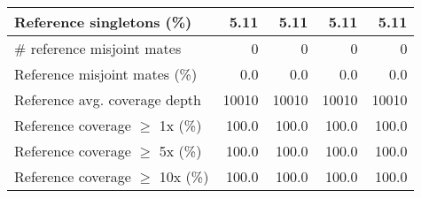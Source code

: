 \documentclass[12pt,a4paper]{article}
\begin{document}
\begin{table}[ht]
\begin{center}
\begin{tabular}{|l*{4}{|r}|}
Reference singletons (\%) & 5.11 & 5.11 & 5.11 & 5.11 \\ \hline
\# reference misjoint mates & 0 & 0 & 0 & 0 \\ \hline
Reference misjoint mates (\%) & 0.0 & 0.0 & 0.0 & 0.0 \\ \hline
Reference avg. coverage depth & 10010 & 10010 & 10010 & 10010 \\ \hline
Reference coverage $\geq$ 1x (\%) & 100.0 & 100.0 & 100.0 & 100.0 \\ \hline
Reference coverage $\geq$ 5x (\%) & 100.0 & 100.0 & 100.0 & 100.0 \\ \hline
Reference coverage $\geq$ 10x (\%) & 100.0 & 100.0 & 100.0 & 100.0 \\ \hline
\end{tabular}
\end{center}
\end{table}
\end{document}
